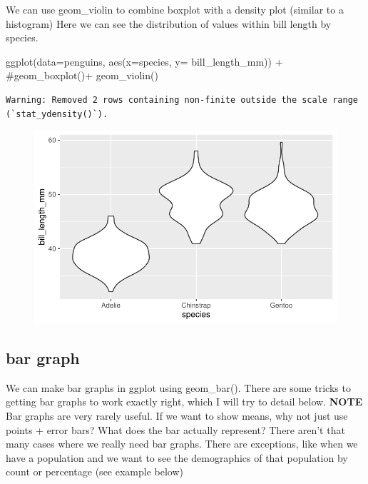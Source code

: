 \documentclass[
  letterpaper,
  DIV=11,
  numbers=noendperiod]{scrartcl}
\newenvironment{Shaded}{\begin{snugshade}}{\end{snugshade}}
\newcommand{\AttributeTok}[1]{\textcolor[rgb]{0.40,0.45,0.13}{#1}}
\newcommand{\CommentTok}[1]{\textcolor[rgb]{0.37,0.37,0.37}{#1}}
\newcommand{\FunctionTok}[1]{\textcolor[rgb]{0.28,0.35,0.67}{#1}}
\newcommand{\NormalTok}[1]{\textcolor[rgb]{0.00,0.23,0.31}{#1}}
\newcommand{\SpecialCharTok}[1]{\textcolor[rgb]{0.37,0.37,0.37}{#1}}
\begin{document}
We can use geom\_violin to combine boxplot with a density plot (similar
to a histogram) Here we can see the distribution of values within bill
length by species.

\begin{Shaded}
\begin{Highlighting}[]
\FunctionTok{ggplot}\NormalTok{(}\AttributeTok{data=}\NormalTok{penguins, }\FunctionTok{aes}\NormalTok{(}\AttributeTok{x=}\NormalTok{species, }\AttributeTok{y=}\NormalTok{ bill\_length\_mm)) }\SpecialCharTok{+}
  \CommentTok{\#geom\_boxplot()+}
  \FunctionTok{geom\_violin}\NormalTok{()}
\end{Highlighting}
\end{Shaded}

\begin{verbatim}
Warning: Removed 2 rows containing non-finite outside the scale range
(`stat_ydensity()`).
\end{verbatim}

\begin{figure}[H]

{\centering \includegraphics{Lab_2_files/figure-pdf/unnamed-chunk-9-1.pdf}

}

\end{figure}

\subsection{\texorpdfstring{\textbf{bar graph}}{bar graph}}

We can make bar graphs in ggplot using geom\_bar(). There are some
tricks to getting bar graphs to work exactly right, which I will try to
detail below. \textbf{NOTE} Bar graphs are very rarely useful. If we
want to show means, why not just use points + error bars? What does the
bar actually represent? There aren't that many cases where we really
need bar graphs. There are exceptions, like when we have a population
and we want to see the demographics of that population by count or
percentage (see example below)
\end{document}
